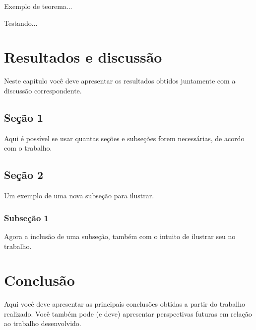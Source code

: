 \documentclass[article,12pt,oneside,a4paper,chapter=TITLE,english,brazil]{abntex2}
\begin{document}
Exemplo de teorema...
\begin{teorema}
	Testando...
\end{teorema}
\vspace{\onelineskip}


\chapter{Resultados e discussão}

Neste capítulo você deve apresentar os resultados obtidos juntamente com a discussão correspondente.

\section{Seção 1}

Aqui é possível se usar quantas seções e subseções forem necessárias, de acordo com o trabalho.

\section{Seção 2}

Um exemplo de uma nova subseção para ilustrar.

\subsection{Subseção 1}

Agora a inclusão de uma subseção, também com o intuito de ilustrar seu no trabalho.
\vspace{\onelineskip}


\chapter{Conclusão}

Aqui você deve apresentar as principais conclusões obtidas a partir do trabalho realizado. Você também pode (e deve) apresentar perspectivas futuras em relação ao trabalho desenvolvido.
\vspace{\onelineskip}


\postextual
\end{document}
